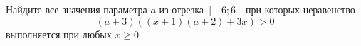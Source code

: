 \begin{ex}
	\begin{condition}
		Найдите все значения параметра \( a \) из отрезка \( [-6;6] \) при которых неравенство \[ (a+3)((x+1)(a+2)+3x)>0 \] выполняется при любых \( x\ge0 \)
	\end{condition}
	\answer{\( [-6;-5]\cup(-2;6] \)}
\end{ex}